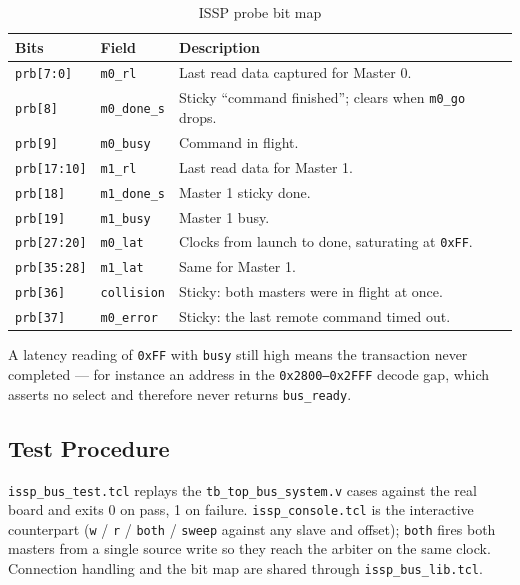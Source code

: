 \documentclass[11pt,a4paper]{article}
\newcommand{\sig}[1]{\texttt{#1}}
\begin{document}
\begin{table}[htbp]
\centering
\caption{ISSP probe bit map}
\label{tab:issp_prb}
\small
\begin{tabularx}{\textwidth}{llX}
\toprule
\textbf{Bits} & \textbf{Field} & \textbf{Description} \\
\midrule
\sig{prb[7:0]}   & \sig{m0\_rl}     & Last read data captured for Master 0. \\
\sig{prb[8]}     & \sig{m0\_done\_s}& Sticky ``command finished''; clears when \sig{m0\_go} drops. \\
\sig{prb[9]}     & \sig{m0\_busy}   & Command in flight. \\
\sig{prb[17:10]} & \sig{m1\_rl}     & Last read data for Master 1. \\
\sig{prb[18]}    & \sig{m1\_done\_s}& Master 1 sticky done. \\
\sig{prb[19]}    & \sig{m1\_busy}   & Master 1 busy. \\
\sig{prb[27:20]} & \sig{m0\_lat}    & Clocks from launch to done, saturating at \sig{0xFF}. \\
\sig{prb[35:28]} & \sig{m1\_lat}    & Same for Master 1. \\
\sig{prb[36]}    & \sig{collision}  & Sticky: both masters were in flight at once. \\
\sig{prb[37]}    & \sig{m0\_error}  & Sticky: the last remote command timed out. \\
\bottomrule
\end{tabularx}
\end{table}

A latency reading of \sig{0xFF} with \sig{busy} still high means the transaction
never completed --- for instance an address in the \texttt{0x2800--0x2FFF}
decode gap, which asserts no select and therefore never returns
\sig{bus\_ready}.

\subsection{Test Procedure}

\sig{issp\_bus\_test.tcl} replays the \sig{tb\_top\_bus\_system.v} cases against
the real board and exits 0 on pass, 1 on failure. \sig{issp\_console.tcl} is the
interactive counterpart (\texttt{w} / \texttt{r} / \texttt{both} /
\texttt{sweep} against any slave and offset); \texttt{both} fires both masters
from a single source write so they reach the arbiter on the same clock.
Connection handling and the bit map are shared through \sig{issp\_bus\_lib.tcl}.
\end{document}
